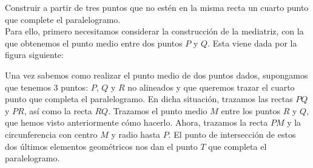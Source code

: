 \begin{ejercicio}
    Construir a partir de tres puntos que no estén en la misma recta un cuarto punto que complete el paralelogramo.\\

    \noindent
    Para ello, primero necesitamos considerar la construcción de la mediatriz, con la que obtenemos el punto medio entre dos puntos $P$ y $Q$. Esta viene dada por la figura siguiente:
    \begin{figure}[H]
        \centering
    \end{figure}
    Una vez sabemos como realizar el punto medio de dos puntos dados, supongamos que tenemos 3 puntos: $P$, $Q$ y $R$ no alineados y que queremos trazar el cuarto punto que completa el paralelogramo. En dicha situación, trazamos las rectas $PQ$ y $PR$, así como la recta $RQ$. Trazamos el punto medio $M$ entre los puntos $R$ y $Q$, que hemos visto anteriormente cómo hacerlo. Ahora, trazamos la recta $PM$ y la circunferencia con centro $M$ y radio hasta $P$. El punto de intersección de estos dos últimos elementos geométricos nos dan el punto $T$ que completa el paralelogramo.
    \begin{figure}[H]
        \centering
    \end{figure}
\end{ejercicio}

